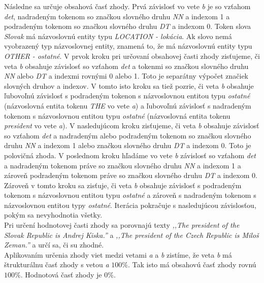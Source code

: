 Následne sa určuje obsahová časť zhody. Prvá závislosť vo vete \textit{b} je so vzťahom \textit{det}, nadradeným tokenom so značkou slovného druhu \textit{NN} a indexom 1 a podradeným tokenom so značkou slovného druhu \textit{DT} a indexom 0. Token slova \textit{Slovak} má názvoslovnú entity typu \textit{LOCATION - lokácia}. Ak slovo nemá vyobrazený typ názvoslovnej entity, znamená to, že má názvoslovnú entity typu \textit{OTHER - ostatné}. V prvok kroku pri určovaní obsahovej časti zhody zisťujeme, či veta \textit{b} obsahuje závislosť so vzťahom \textit{det} a tokenmi so značkou slovného druhu \textit{NN} alebo \textit{DT} a indexmi rovnými 0 alebo 1. Toto je separátny výpočet značiek slovných druhov a indexov. V tomto isto kroku sa tiež pozrie, či veta \textit{b} obsahuje ľubovoľnú závislosť s podradeným tokenon s názvoslovnou entitou typu \textit{ostatné} (názvoslovná entita tokenu \textit{THE} vo vete \textit{a}) a ľubovoľnú závislosť s nadradeným tokenom s názvoslovnou entitou typu \textit{ostatné} (názvoslovná entita tokenu \textit{president} vo vete \textit{a}). V nasledujúcom kroku zisťujeme, či veta \textit{b} obsahuje závislosť so vzťahom \textit{det} a nadradeným alebo podradeným tokenom so značkou slovného druhu \textit{NN} a indexom 1 alebo značkou slovného druhu \textit{DT} a indexom 0. Toto je polovičná zhoda. V poslednom kroku hľadáme vo vete \textit{b} závislosť so vzťahom \textit{det} a nadradeným tokenom práve so značkou slovného druhu \textit{NN} a indexom 1 a zároveň podradeným tokenom práve so značkou slovného druhu \textit{DT} a indexom 0. Zároveň v tomto kroku sa zisťuje, či veta \textit{b} obsahuje závislosť s podradeným tokenom s názvoslovnou entitou typu \textit{ostatné} a zároveň s nadradeným tokenom s názvoslovnou entitou typy \textit{ostatné}. Iterácia pokračuje s nasledujúcou závislosťou, pokým sa nevyhodnotia všetky. \\

Pri určení hodnotovej časti zhody sa porovnajú texty \textit{,,The president of the Slovak Republic is Andrej Kiska.''} a \textit{,,The president of the Czech Republic is Miloš Zeman.''} a určí sa, či su zhodné. \\

Aplikovaním určenia zhody viet medzi vetami \textit{a} a \textit{b} zistíme, že veta \textit{b} má štrukturálnu časť zhody s vetou \textit{a} $100\%$. Tak isto má obsahovú časť zhody rovnú $100\%$. Hodnotová časť zhody je $0\%$.

